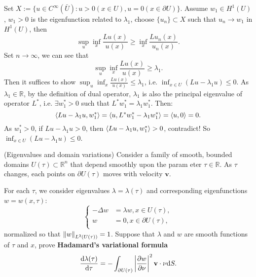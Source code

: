 \begin{solution}
    Set $X:=\{u\in C^{\infty}(\bar{U}):u>0(x\in U),u=0(x\in\partial U)\}$. Assume $w_{1}\in H^{1}(U)$, $w_{1}>0$ is the eigenfunction related to $\lambda_{1}$, choose $\{u_{n}\}\subset X$ such that $u_{n}\rightarrow w_{1}$ in $H^{1}(U)$, then 
    \begin{equation}
    \sup_{u}\inf_{x}\frac{Lu(x)}{u(x)}\ge\inf_{x}\frac{Lu_{n}(x)}{u_{n}(x)}.
    \end{equation}
    Set $n\rightarrow\infty$, we can see that 
    \begin{equation}
        \sup_{u}\inf_{x}\frac{Lu(x)}{u(x)}\ge\lambda_{1}.
    \end{equation}
    Then it suffices to show $\sup_{u}\inf_{x}\frac{Lu(x)}{u(x)}\le\lambda_{1}$, i.e. $\inf_{x\in U}(Lu-\lambda_{1}u)\le 0$. As $\lambda_{1}\in\mathbb{R}$, by the definition of dual operator, $\lambda_{1}$ is also the principal eigenvalue of operator $L^{*}$, i.e. $\exists w_{1}^{*}>0$ such that $L^{*}w_{1}^{*}=\lambda_{1}w_{1}^{*}$. Then:
    \begin{equation}
        \left<Lu-\lambda_{1}u,w_{1}^{*}\right>=\left<u,L^{*}w_{1}^{*}-\lambda_{1}w_{1}^{*}\right>=\left<u,0\right>=0.
    \end{equation}
    As $w_{1}^{*}>0$, if $Lu-\lambda_{1}u>0$, then $\left<Lu-\lambda_{1}u,w_{1}^{*}\right>>0$, contradict! So $\inf_{x\in U}(Lu-\lambda_{1}u)\le 0$.
\end{solution}
\begin{exercise}
(Eigenvalues and domain variations) Consider a family of smooth, bounded domains $U(\tau)\subset\mathbb{R}^{n}$ that depend smoothly upon the param
eter $\tau\in\mathbb{R}$. As $\tau$ changes, each points on $\partial U(\tau)$ moves with velocity $\mathbf{v}$.

For each $\tau$, we consider eigenvalues $\lambda=\lambda(\tau)$ and corresponding eigenfunctions $w=w(x,\tau)$:
\begin{equation}
    \label{eq:eig_prob_for_variable_domains}
    \left\{
    \begin{aligned}
        -\Delta w&=\lambda w, x\in U(\tau),\\
        w&=0,x\in\partial U(\tau),\\
    \end{aligned}
    \right.
\end{equation}
normalized so that $\left\|w\right\|_{L^{2}(U(\tau))}=1$. Suppose that $\lambda$ and $w$ are smooth functions of $\tau$ and $x$, prove \textbf{Hadamard's variational formula}
\begin{equation}
    \label{eq:Hvf}
    \frac{\mathrm{d} \lambda(\tau)}{\mathrm{d}\tau}=-\int_{\partial U(\tau)}\left|\frac{\partial w}{\partial \nu}\right|^{2}\mathbf{v}\cdot\nu\mathrm{d} S.
\end{equation}
\end{exercise}

